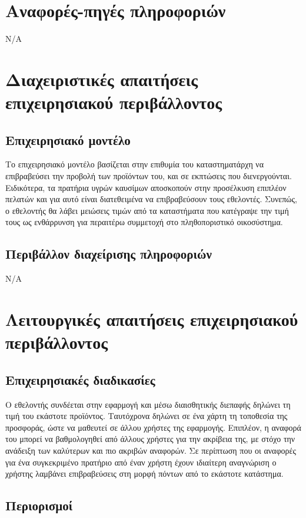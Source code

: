 \documentclass[a4paper,oneside, 12pt]{article}
\begin{document}
\section{Αναφορές-πηγές πληροφοριών}

Ν/Α

\section{Διαχειριστικές απαιτήσεις επιχειρησιακού περιβάλλοντος}
\subsection{Επιχειρησιακό μοντέλο}
Το επιχειρησιακό μοντέλο βασίζεται στην επιθυμία του καταστηματάρχη να επιβραβεύσει την προβολή των προϊόντων του, και σε εκπτώσεις που διενεργούνται. Ειδικότερα, τα πρατήρια υγρών καυσίμων αποσκοπούν στην προσέλκυση επιπλέον πελατών και για αυτό είναι διατεθειμένα να επιβραβεύσουν τους εθελοντές. Συνεπώς, ο εθελοντής θα λάβει μειώσεις τιμών από τα καταστήματα που κατέγραψε την τιμή τους ως ενθάρρυνση για περαιτέρω συμμετοχή στο πληθοποριστικό οικοσύστημα. 

\subsection{Περιβάλλον διαχείρισης πληροφοριών}

N/A

\section{Λειτουργικές απαιτήσεις επιχειρησιακού περιβάλλοντος}
\subsection{Επιχειρησιακές διαδικασίες}
Ο εθελοντής συνδέεται στην εφαρμογή και μέσω διαισθητικής διεπαφής δηλώνει τη τιμή του εκάστοτε προϊόντος. Ταυτόχρονα δηλώνει σε ένα χάρτη τη τοποθεσία της προσφοράς, ώστε να μαθευτεί σε άλλου χρήστες της εφαρμογής. Επιπλέον, η αναφορά του μπορεί να βαθμολογηθεί από άλλους χρήστες για την ακρίβεια της, με στόχο την ανάδειξη των καλύτερων και πιο ακριβών αναφορών. Σε περίπτωση που οι αναφορές για ένα συγκεκριμένο πρατήριο από έναν χρήστη έχουν ιδιαίτερη αναγνώριση ο χρήστης λαμβάνει επιβραβεύσεις στη μορφή πόντων από το εκάστοτε κατάστημα.

\subsection{Περιορισμοί}
\end{document}
